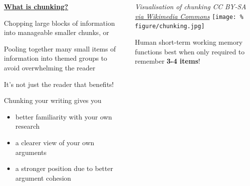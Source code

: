 \documentclass[unknownkeysallowed,usepdftitle=false, parskip=full]{beamer}
\newcommand{\secvariable}{nothing}
\newcommand{\mysection}[1]{\renewcommand{\secvariable}{#1}
}
\begin{document}
\mysection{line}
\begin{frame}\label{\secvariable}
\begin{center}
  \vspace{-1cm}
  
  \begin{columns}[t]
    \begin{column}[c]{0.5\textwidth}
    \parbox{\linewidth}{\small
    
    \vspace{2em}
    
\centering\textbf{\underline{What is chunking?}}\flushleft
    
    \vspace{1em}
    
    Chopping large blocks of information into manageable smaller chunks, or
    
    \vspace{0.5em}
    
    Pooling together many small items of information into themed groups to avoid overwhelming the reader
    
    \vspace{0.5em}    
    
    It's not just the reader that benefits! 
    
    \vspace{0.5em}
    
    Chunking your writing gives you
    
    \begin{itemize}
        \item better familiarity with your own research
        \item a clearer view of your own arguments
        \item a stronger position due to better argument cohesion
    \end{itemize}}  

    \end{column}
\begin{column}[c]{0.6\textwidth}
 \centering
 
 \vspace{1em}
 
 \tiny{\textit{Visualisation of chunking CC BY-SA \href{https://upload.wikimedia.org/wikipedia/commons/9/9c/2_Views_of_Chunking\_\%28Figure\_2\%29.jpg}{via Wikimedia Commons}}}
 \texttt{[image: \%
  figure/chunking.jpg]}
    
    \vspace{0.5em}
    \scriptsize Human short-term working memory functions best when only required to remember \textbf{3-4 items}!
    \end{column}
    
  \end{columns}

\end{center}
\end{frame}
\end{document}
